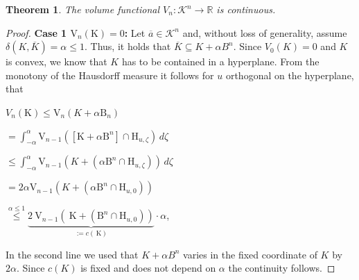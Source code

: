 \documentclass[a4paper]{book}
\newtheorem{theorem}{Theorem}%
\numberwithin{theorem}{section}%
\begin{document}
\begin{theorem}
    The volume functional $V_{n}:\mathscr{K}^{n}\to\mathbb{R}$ is continuous.
\end{theorem}
\begin{proof}
    \textbf{Case 1 $\mathrm{V}_{n}(\mathrm{K})=0$:}
    Let $\overline{a}\in\mathscr{K}^{n}$ and, without loss of generality, assume $\delta(K,\overline{K})=\alpha\leq1$. Thus, it holds that $\overline{K}\subseteq K+\alpha B^{n}$. Since $V_{0}(K)=0$ and $K$ is convex, we know that $K$ has to be contained in a hyperplane. From the monotony of the Hausdorff measure it follows for $u$ orthogonal on the hyperplane, that
    \begin{center}
        $V_{n}(\mathrm{K})\leq \mathrm{V}_{n}(K+\alpha \mathrm{B}_{n})$

        $=\int_{-\alpha}^{\alpha}\mathrm{V}_{n-1}([\mathrm{K}+\alpha \mathrm{B}^{n}]\cap\mathrm{H}_{u,\zeta})\,d\zeta$

        $\leq\int_{-\alpha}^{\alpha}\mathrm{V}_{n-1}(K+(\alpha\mathrm{B}^{n}\cap\mathrm{H}_{u,\zeta}))\,d\zeta$

        $=2\alpha \mathrm{V}_{n-1}(K+(\alpha\mathrm{B}^{n}\cap\mathrm{H}_{u,0}))$

        $\overset{\alpha\leq1}{\leq}\underbrace{2\mathrm{~V}_{n-1}\left(\mathrm{~K}+\left(\mathrm{B}^n\cap \mathrm{H}_{u, 0}\right)\right)}_{:=c(\mathrm{~K})}\cdot\alpha$,
    \end{center}
    In the second line we used that $K+\alpha B^{n}$ varies in the fixed coordinate of $K$ by $2\alpha$. Since $c(K)$ is fixed and does not depend on $\alpha$ the continuity follows.


\end{proof}
\end{document}
